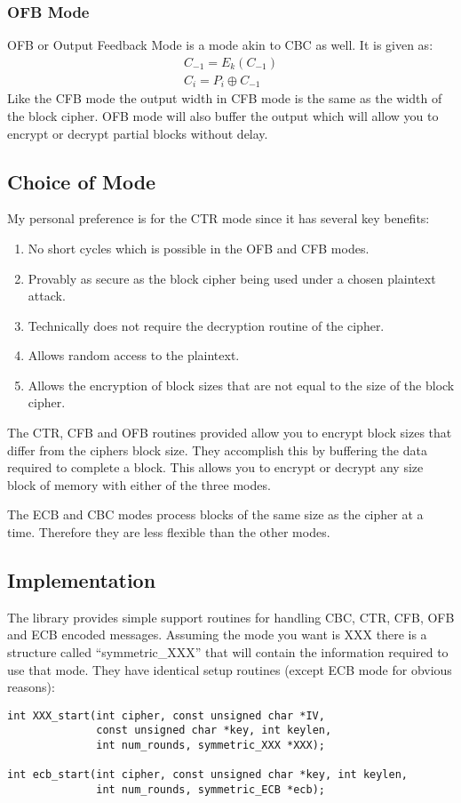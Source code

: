 \documentclass[b5paper]{book}
\begin{document}
\subsubsection{OFB Mode}
OFB or Output Feedback Mode is a mode akin to CBC as well.  It is given as:
\begin{eqnarray}
C_{-1} = E_k(C_{-1}) \nonumber \\
C_i = P_i \oplus C_{-1}
\end{eqnarray}
Like the CFB mode the output width in CFB mode is the same as the width of the block cipher.  OFB mode will also
buffer the output which will allow you to encrypt or decrypt partial blocks without delay.

\subsection{Choice of Mode}
My personal preference is for the CTR mode since it has several key benefits:
\begin{enumerate}
   \item No short cycles which is possible in the OFB and CFB modes.
   \item Provably as secure as the block cipher being used under a chosen plaintext attack.
   \item Technically does not require the decryption routine of the cipher.
   \item Allows random access to the plaintext.
   \item Allows the encryption of block sizes that are not equal to the size of the block cipher.
\end{enumerate}
The CTR, CFB and OFB routines provided allow you to encrypt block sizes that differ from the ciphers block size.  They 
accomplish this by buffering the data required to complete a block.  This allows you to encrypt or decrypt any size 
block of memory with either of the three modes.

The ECB and CBC modes process blocks of the same size as the cipher at a time.  Therefore they are less flexible than the
other modes.

\subsection{Implementation}
 
 
The library provides simple support routines for handling CBC, CTR, CFB, OFB and ECB encoded messages.  Assuming the mode 
you want is XXX there is a structure called ``symmetric\_XXX'' that will contain the information required to
use that mode.  They have identical setup routines (except ECB mode for obvious reasons):
\begin{verbatim}
int XXX_start(int cipher, const unsigned char *IV, 
              const unsigned char *key, int keylen, 
              int num_rounds, symmetric_XXX *XXX);

int ecb_start(int cipher, const unsigned char *key, int keylen, 
              int num_rounds, symmetric_ECB *ecb);
\end{verbatim}
\end{document}
